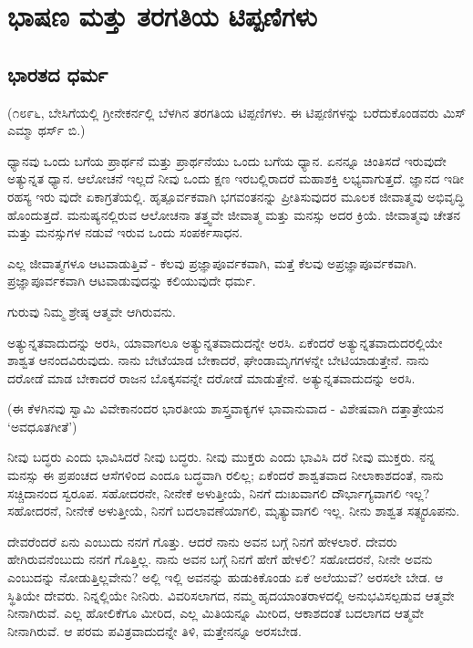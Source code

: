 

\part{ಭಾಷಣ ಮತ್ತು ತರಗತಿಯ ಟಿಪ್ಪಣಿಗಳು}

\chapter{ಭಾರತದ ಧರ್ಮ}

(೧೮೯೬, ಬೇಸಿಗೆಯಲ್ಲಿ ಗ್ರೀನೇಕರ್ನಲ್ಲಿ ಬೆಳಗಿನ ತರಗತಿಯ ಟಿಪ್ಪಣಿಗಳು. ಈ ಟಿಪ್ಪಣಿಗಳನ್ನು ಬರೆದುಕೊಂಡವರು ಮಿಸ್ ಎಮ್ಮಾ ಥರ್ಸ್ ಬಿ.)

ಧ್ಯಾನವು ಒಂದು ಬಗೆಯ ಪ್ರಾರ್ಥನೆ ಮತ್ತು ಪ್ರಾರ್ಥನೆಯು ಒಂದು ಬಗೆಯ ಧ್ಯಾನ. ಏನನ್ನೂ ಚಿಂತಿಸದೆ ಇರುವುದೇ ಅತ್ಯುನ್ನತ ಧ್ಯಾನ. ಆಲೋಚನೆ ಇಲ್ಲದೆ ನೀವು ಒಂದು ಕ್ಷಣ ಇರಬಲ್ಲಿರಾದರೆ ಮಹಾಶಕ್ತಿ ಲಭ್ಯವಾಗುತ್ತದೆ. ಜ್ಞಾನದ ಇಡೀ ರಹಸ್ಯ ಇರು ವುದೇ ಏಕಾಗ್ರತೆಯಲ್ಲಿ. ಹೃತ್ಪೂರ್ವಕವಾಗಿ ಭಗವಂತನನ್ನು ಪ್ರೀತಿಸುವುದರ ಮೂಲಕ ಜೀವಾತ್ಮವು ಅಭಿವೃದ್ಧಿ ಹೊಂದುತ್ತದೆ. ಮನುಷ್ಯನಲ್ಲಿರುವ ಆಲೋಚನಾ ತತ್ತ್ವವೇ ಜೀವಾತ್ಮ ಮತ್ತು ಮನಸ್ಸು ಅದರ ಕ್ರಿಯೆ. ಜೀವಾತ್ಮವು ಚೇತನ ಮತ್ತು ಮನಸ್ಸುಗಳ ನಡುವೆ ಇರುವ ಒಂದು ಸಂಪರ್ಕಸಾಧನ.

ಎಲ್ಲ ಜೀವಾತ್ಮಗಳೂ ಆಟವಾಡುತ್ತಿವೆ - ಕೆಲವು ಪ್ರಜ್ಞಾಪೂರ್ವಕವಾಗಿ, ಮತ್ತೆ ಕೆಲವು ಅಪ್ರಜ್ಞಾಪೂರ್ವಕವಾಗಿ. ಪ್ರಜ್ಞಾಪೂರ್ವಕವಾಗಿ ಆಟವಾಡುವುದನ್ನು ಕಲಿಯುವುದೇ ಧರ್ಮ.

ಗುರುವು ನಿಮ್ಮ ಶ್ರೇಷ್ಠ ಆತ್ಮವೇ ಆಗಿರುವನು.

ಅತ್ಯುನ್ನತವಾದುದನ್ನು ಅರಸಿ, ಯಾವಾಗಲೂ ಅತ್ಯುನ್ನತವಾದುದನ್ನೇ ಅರಸಿ. ಏಕೆಂದರೆ ಅತ್ಯುನ್ನತವಾದುದರಲ್ಲಿಯೇ ಶಾಶ್ವತ ಆನಂದವಿರುವುದು. ನಾನು ಬೇಟೆಯಾಡ ಬೇಕಾದರೆ, ಘೇಂಡಾಮೃಗಗಳನ್ನೇ ಬೇಟಿಯಾಡುತ್ತೇನೆ. ನಾನು ದರೋಡೆ ಮಾಡ ಬೇಕಾದರೆ ರಾಜನ ಬೊಕ್ಕಸವನ್ನೇ ದರೋಡೆ ಮಾಡುತ್ತೇನೆ. ಅತ್ಯುನ್ನತವಾದುದನ್ನು ಅರಸಿ.

(ಈ ಕೆಳಗಿನವು ಸ್ವಾಮಿ ವಿವೇಕಾನಂದರ ಭಾರತೀಯ ಶಾಸ್ತ್ರವಾಕ್ಯಗಳ ಭಾವಾನುವಾದ - ವಿಶೇಷವಾಗಿ ದತ್ತಾತ್ರೇಯನ ‘ಅವಧೂತಗೀತೆ’)

ನೀವು ಬದ್ಧರು ಎಂದು ಭಾವಿಸಿದರೆ ನೀವು ಬದ್ಧರು. ನೀವು ಮುಕ್ತರು ಎಂದು ಭಾವಿಸಿ ದರೆ ನೀವು ಮುಕ್ತರು. ನನ್ನ ಮನಸ್ಸು ಈ ಪ್ರಪಂಚದ ಆಸೆಗಳಿಂದ ಎಂದೂ ಬದ್ಧವಾಗಿ ರಲಿಲ್ಲ; ಏಕೆಂದರೆ ಶಾಶ್ವತವಾದ ನೀಲಾಕಾಶದಂತೆ, ನಾನು ಸಚ್ಚಿದಾನಂದ ಸ್ವರೂಪ. ಸಹೋದರನೇ, ನೀನೇಕೆ ಅಳುತ್ತೀಯೆ, ನಿನಗೆ ದುಃಖವಾಗಲಿ ದೌರ್ಭಾಗ್ಯವಾಗಲಿ ಇಲ್ಲ? ಸಹೋದರನೆ, ನೀನೇಕೆ ಅಳುತ್ತೀಯೆ, ನಿನಗೆ ಬದಲಾವಣೆಯಾಗಲಿ, ಮೃತ್ಯುವಾಗಲಿ ಇಲ್ಲ. ನೀನು ಶಾಶ್ವತ ಸತ್ಸ್ವರೂಪನು.

ದೇವರೆಂದರೆ ಏನು ಎಂಬುದು ನನಗೆ ಗೊತ್ತು. ಆದರೆ ನಾನು ಅವನ ಬಗ್ಗೆ ನಿನಗೆ ಹೇಳಲಾರೆ. ದೇವರು ಹೇಗಿರುವನೆಂಬುದು ನನಗೆ ಗೊತ್ತಿಲ್ಲ. ನಾನು ಅವನ ಬಗ್ಗೆ ನಿನಗೆ ಹೇಗೆ ಹೇಳಲಿ? ಸಹೋದರನೆ, ನೀನೇ ಅವನು ಎಂಬುದನ್ನು ನೋಡುತ್ತಿಲ್ಲವೇನು? ಅಲ್ಲಿ ಇಲ್ಲಿ ಅವನನ್ನು ಹುಡುಕಿಕೊಂಡು ಏಕೆ ಅಲೆಯುವೆ? ಅರಸಲೇ ಬೇಡ. ಆ ಸ್ಥಿತಿಯೇ ದೇವರು. ನಿನ್ನಲ್ಲಿಯೇ ನೀನಿರು. ವಿವರಿಸಲಾಗದ, ನಮ್ಮ ಹೃದಯಾಂತರಾಳದಲ್ಲಿ ಅನುಭವಿಸಲ್ಪಡುವ ಆತ್ಮವೇ ನೀನಾಗಿರುವೆ. ಎಲ್ಲ ಹೋಲಿಕೆಗೂ ಮೀರಿದ, ಎಲ್ಲ ಮಿತಿಯನ್ನೂ ಮೀರಿದ, ಆಕಾಶದಂತೆ ಬದಲಾಗದ ಆತ್ಮವೇ ನೀನಾಗಿರುವೆ. ಆ ಪರಮ ಪವಿತ್ರವಾದುದನ್ನೇ ತಿಳಿ, ಮತ್ತೇನನ್ನೂ ಅರಸಬೇಡ.


